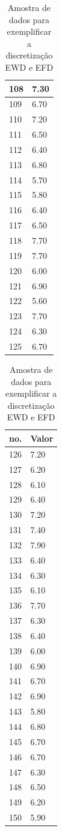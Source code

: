 \begin{table}[!ht]
\begin{tabular}{ |l|l| }
108	&	7.30	\\ \hline
109	&	6.70	\\ \hline
110	&	7.20	\\ \hline
111	&	6.50	\\ \hline
112	&	6.40	\\ \hline
113	&	6.80	\\ \hline
114	&	5.70	\\ \hline
115	&	5.80	\\ \hline
116	&	6.40	\\ \hline
117	&	6.50	\\ \hline
118	&	7.70	\\ \hline
119	&	7.70	\\ \hline
120	&	6.00	\\ \hline
121	&	6.90	\\ \hline
122	&	5.60	\\ \hline
123	&	7.70	\\ \hline
124	&	6.30	\\ \hline
125	&	6.70	\\ \hline
\end{tabular}
\begin{tabular}{ |l|l| }
\hline
 no. & Valor \\ \hline
126	&	7.20	\\ \hline
127	&	6.20	\\ \hline
128	&	6.10	\\ \hline
129	&	6.40	\\ \hline
130	&	7.20	\\ \hline
131	&	7.40	\\ \hline
132	&	7.90	\\ \hline
133	&	6.40	\\ \hline
134	&	6.30	\\ \hline
135	&	6.10	\\ \hline
136	&	7.70	\\ \hline
137	&	6.30	\\ \hline
138	&	6.40	\\ \hline
139	&	6.00	\\ \hline
140	&	6.90	\\ \hline
141	&	6.70	\\ \hline
142	&	6.90	\\ \hline
143	&	5.80	\\ \hline
144	&	6.80	\\ \hline
145	&	6.70	\\ \hline
146	&	6.70	\\ \hline
147	&	6.30	\\ \hline
148	&	6.50	\\ \hline
149	&	6.20	\\ \hline
150	&	5.90	\\ \hline

\end{tabular}
\caption{Amostra de dados para exemplificar a discretização EWD e EFD}
\label{tab:amostraDiscret}
\end{table}



